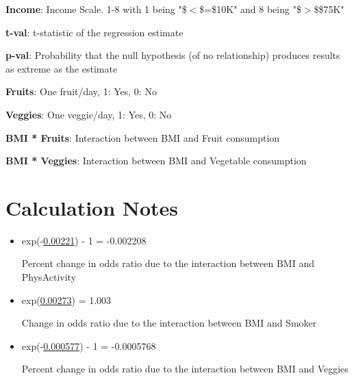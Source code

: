 \documentclass[11pt]{article}
\begin{document}
\begin{codeoutput}
\begin{table}[h]
\begin{threeparttable}
\begin{tablenotes}
\item \textbf{Income}: Income Scale. 1-8 with 1 being "\$$<$\$=\$10K" and 8 being "\$$>$\$\$75K"
\item \textbf{t-val}: t-statistic of the regression estimate
\item \textbf{p-val}: Probability that the null hypothesis (of no relationship) produces results as extreme as the estimate
\item \textbf{Fruits}: One fruit/day, 1: Yes, 0: No
\item \textbf{Veggies}: One veggie/day, 1: Yes, 0: No
\item \textbf{BMI * Fruits}: Interaction between BMI and Fruit consumption
\item \textbf{BMI * Veggies}: Interaction between BMI and Vegetable consumption
\end{tablenotes}
\end{threeparttable}
\end{table}

\end{codeoutput}

\section{Calculation Notes}
\begin{itemize}
\item{exp(-\hyperlink{B4a}{0.00221}) - 1 = -0.002208

Percent change in odds ratio due to the interaction between BMI and PhysActivity}
\item{exp(\hyperlink{C4a}{0.00273}) = 1.003

Change in odds ratio due to the interaction between BMI and Smoker}
\item{exp(-\hyperlink{D6a}{0.000577}) - 1 = -0.0005768

Percent change in odds ratio due to the interaction between BMI and Veggies}
\end{itemize}
\end{document}
